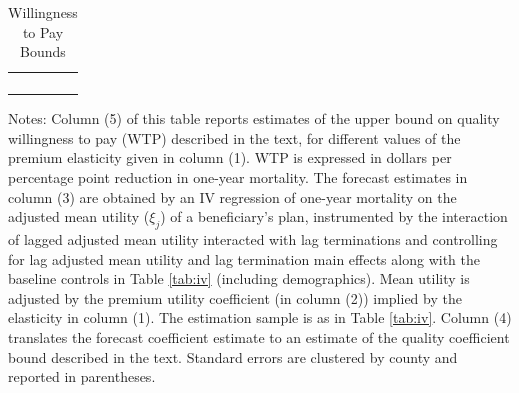 \documentclass[12pt,english,hidelinks]{article}
\begin{document}
\begin{table}[t]
  \caption{\label{tab:wtp}Willingness to Pay Bounds}
  \vspace{-0.25cm}
  \begin{center}
  \begin{tabular}{c *{2}{d{1.4}}*{2}{d{3.3}}}
  \toprule 
   &  &  &  &  \tabularnewline
   &  &  & & \tabularnewline
    &  &  & & \tabularnewline
   &  &  &  &  \tabularnewline
  \midrule
  
  \end{tabular}
  \par\end{center}
  {\footnotesize{}Notes: Column (5) of this table reports estimates of the upper bound on quality willingness to pay (WTP) described in the text, for different values of the premium elasticity given in column (1). WTP is expressed in dollars per percentage point reduction in one-year mortality. The forecast estimates in column (3) are obtained by an IV regression of one-year mortality on the adjusted mean utility ($\xi_j$) of a beneficiary's plan, instrumented by the interaction of lagged adjusted mean utility interacted with lag terminations and controlling for lag adjusted mean utility and lag termination main effects along with the baseline controls in Table \ref{tab:iv} (including demographics). Mean utility is adjusted by the premium utility coefficient (in column (2)) implied by the elasticity in column (1). The estimation sample is as in Table \ref{tab:iv}. Column (4) translates the forecast coefficient estimate to an estimate of the quality coefficient bound described in the text. Standard errors are clustered by county and reported in parentheses.}
  \vspace{-0.1cm}
\end{table}


\clearpage
\appendix
\setcounter{figure}{0} \renewcommand{\thefigure}{A.\Roman{figure}.}
\setcounter{table}{0} \renewcommand{\thetable}{A.\Roman{table}.}
\end{document}
